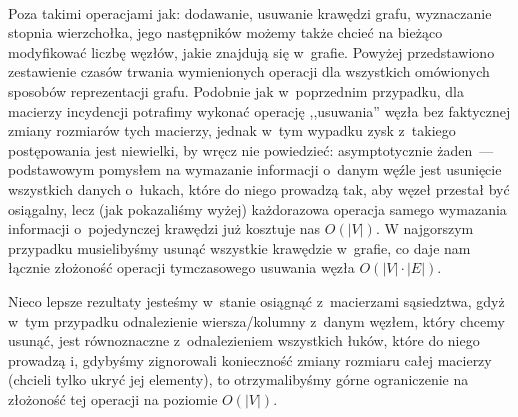 ~

Poza takimi operacjami jak: dodawanie, usuwanie krawędzi grafu, wyznaczanie stopnia wierzchołka, jego następników możemy także chcieć na bieżąco modyfikować liczbę węzłów, jakie znajdują się w~grafie. Powyżej przedstawiono zestawienie czasów trwania wymienionych operacji dla wszystkich omówionych sposobów reprezentacji grafu. Podobnie jak w~poprzednim przypadku, dla macierzy incydencji potrafimy wykonać operację ,,usuwania'' węzła bez faktycznej zmiany rozmiarów tych macierzy, jednak w~tym wypadku zysk z~takiego postępowania jest niewielki, by wręcz nie powiedzieć: asymptotycznie żaden~---  podstawowym pomysłem na wymazanie informacji o~danym węźle jest usunięcie wszystkich danych o~łukach, które do niego prowadzą tak, aby węzeł przestał być osiągalny, lecz (jak pokazaliśmy wyżej) każdorazowa operacja samego wymazania informacji o~pojedynczej krawędzi już kosztuje nas $O \left( \left| V \right| \right) $. W najgorszym przypadku musielibyśmy usunąć wszystkie krawędzie w~grafie, co daje nam łącznie złożoność operacji tymczasowego usuwania węzła $O \left( \left| V \right| \cdot  \left| E \right| \right) $. 

Nieco lepsze rezultaty jesteśmy w~stanie osiągnąć z~macierzami sąsiedztwa, gdyż w~tym przypadku odnalezienie wiersza/kolumny z~danym węzłem, który chcemy usunąć, jest równoznaczne z~odnalezieniem wszystkich łuków, które do niego prowadzą i, gdybyśmy zignorowali konieczność zmiany rozmiaru całej macierzy (chcieli tylko ukryć jej elementy), to otrzymalibyśmy górne ograniczenie na złożoność tej operacji na poziomie $ O \left( \left| V \right| \right)$.

